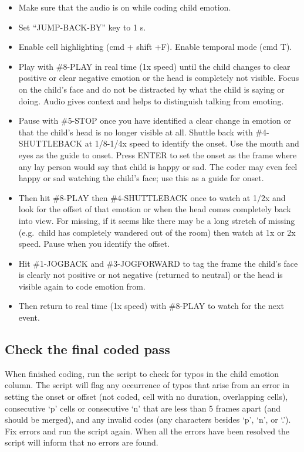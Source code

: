 \documentclass[
]{book}
\providecommand{\tightlist}{%
  \setlength{\itemsep}{0pt}\setlength{\parskip}{0pt}}
\begin{document}
\begin{itemize}
\tightlist
\item
  Make sure that the audio is on while coding child emotion.
\item
  Set ``JUMP-BACK-BY'' key to 1 s.
\item
  Enable cell highlighting (cmd + shift +F). Enable temporal mode (cmd T).
\item
  Play with \#8-PLAY in real time (1x speed) until the child changes to clear positive or clear negative emotion or the head is completely not visible. Focus on the child's face and do not be distracted by what the child is saying or doing. Audio gives context and helps to distinguish talking from emoting.
\item
  Pause with \#5-STOP once you have identified a clear change in emotion or that the child's head is no longer visible at all. Shuttle back with \#4-SHUTTLEBACK at 1/8-1/4x speed to identify the onset. Use the mouth and eyes as the guide to onset. Press ENTER to set the onset as the frame where any lay person would say that child is happy or sad. The coder may even feel happy or sad watching the child's face; use this as a guide for onset.
\item
  Then hit \#8-PLAY then \#4-SHUTTLEBACK once to watch at 1/2x and look for the offset of that emotion or when the head comes completely back into view. For missing, if it seems like there may be a long stretch of missing (e.g.~child has completely wandered out of the room) then watch at 1x or 2x speed. Pause when you identify the offset.
\item
  Hit \#1-JOGBACK and \#3-JOGFORWARD to tag the frame the child's face is clearly not positive or not negative (returned to neutral) or the head is visible again to code emotion from.
\item
  Then return to real time (1x speed) with \#8-PLAY to watch for the next event.
\end{itemize}

\hypertarget{check-the-final-coded-pass}{%
\subsection*{Check the final coded pass}\label{check-the-final-coded-pass}}

When finished coding, run the script to check for typos in the child emotion column. The script will flag any occurrence of typos that arise from an error in setting the onset or offset (not coded, cell with no duration, overlapping cells), consecutive `p' cells or consecutive `n' that are less than 5 frames apart (and should be merged), and any invalid codes (any characters besides `p', `n', or `.'). Fix errors and run the script again. When all the errors have been resolved the script will inform that no errors are found.
\end{document}

